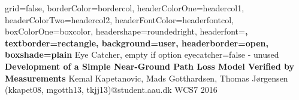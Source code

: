 \documentclass[a0paper,landscape]{baposter}
\begin{document}

\background{
}

\begin{poster}{
	grid=false,
	borderColor=bordercol,
	headerColorOne=headercol1,
	headerColorTwo=headercol2,
	headerFontColor=headerfontcol,
	boxColorOne=boxcolor,
	headershape=roundedright,
	headerfont=\Large\sf\bf,
	textborder=rectangle,
	background=user,
	headerborder=open,
  boxshade=plain
}
{
	Eye Catcher, empty if option eyecatcher=false - unused
}
{\sf\bf
	Development of a Simple Near-Ground Path Loss Model Verified by Measurements
}
{
	\vspace{1em} Kemal Kapetanovic, Mads Gotthardsen, Thomas Jørgensen\\
	{\smaller (kkapet08, mgotth13, tkjj13)@student.aau.dk WCS7 2016}
}
{
\setlength\fboxsep{0pt}
\setlength\fboxrule{0.5pt}
	\fbox{
		\begin{minipage}{14em}
		\end{minipage}
	}
}

\end{poster}
\end{document}
